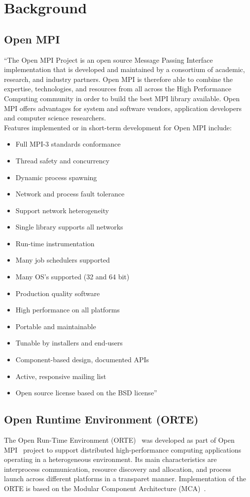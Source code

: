 \chapter{Background}
\label{sec:Background}

\section{Open MPI}
``The Open MPI Project is an open source Message Passing Interface implementation that is developed and maintained by a consortium of academic, research, and industry partners. Open MPI is therefore able to combine the expertise, technologies, and resources from all across the High Performance Computing community in order to build the best MPI library available. Open MPI offers advantages for system and software vendors, application developers and computer science researchers.\\
Features implemented or in short-term development for Open MPI include:
\begin{itemize}
  \item Full MPI-3 standards conformance
  \item Thread safety and concurrency
  \item Dynamic process spawning
  \item Network and process fault tolerance
  \item Support network heterogeneity
  \item Single library supports all networks
  \item Run-time instrumentation
  \item Many job schedulers supported
  \item Many OS's supported (32 and 64 bit)
  \item Production quality software
  \item High performance on all platforms
  \item Portable and maintainable
  \item Tunable by installers and end-users
  \item Component-based design, documented APIs
  \item Active, responsive mailing list
  \item Open source license based on the BSD license''~\cite{openmpi}
\end{itemize}
    
\section{Open Runtime Environment (ORTE)}
The Open Run-Time Environment (ORTE)~\cite{Castain2008153} was developed as part of Open MPI~\cite{gabriel04:_open_mpi} project to support distributed high-performance computing applications operating in a heterogeneous environment. Its main characteristics are interprocess communication, resource discovery and allocation, and process launch across different platforms in a transparet manner. Implementation of the ORTE is based on the Modular Component Architecture (MCA)~\cite{gabriel04:_open_mpi}.

